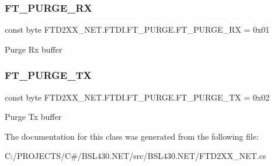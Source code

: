 \subsubsection{\texorpdfstring{FT\_PURGE\_RX}{FT\_PURGE\_RX}}
{\footnotesize\ttfamily const byte F\+T\+D2\+X\+X\+\_\+\+N\+E\+T.\+F\+T\+D\+I.\+F\+T\+\_\+\+P\+U\+R\+G\+E.\+F\+T\+\_\+\+P\+U\+R\+G\+E\+\_\+\+RX = 0x01}



Purge Rx buffer 

\mbox{\label{class_f_t_d2_x_x___n_e_t_1_1_f_t_d_i_1_1_f_t___p_u_r_g_e_aee820dc09c2fe3d0a4390d786428b42c}} 
\subsubsection{\texorpdfstring{FT\_PURGE\_TX}{FT\_PURGE\_TX}}
{\footnotesize\ttfamily const byte F\+T\+D2\+X\+X\+\_\+\+N\+E\+T.\+F\+T\+D\+I.\+F\+T\+\_\+\+P\+U\+R\+G\+E.\+F\+T\+\_\+\+P\+U\+R\+G\+E\+\_\+\+TX = 0x02}



Purge Tx buffer 



The documentation for this class was generated from the following file\+:\begin{DoxyCompactItemize}
\item 
C\+:/\+P\+R\+O\+J\+E\+C\+T\+S/\+C\#/\+B\+S\+L430.\+N\+E\+T/src/\+B\+S\+L430.\+N\+E\+T/F\+T\+D2\+X\+X\+\_\+\+N\+E\+T.\+cs\end{DoxyCompactItemize}
